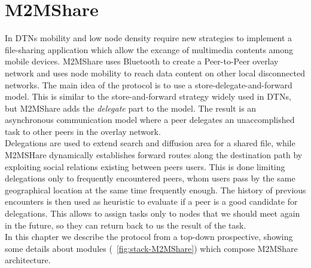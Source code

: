
\chapter{M2MShare}\label{m2mshare} %





In DTNs mobility and low node density require new strategies to implement a file-sharing application which allow the excange of multimedia contents among mobile devices. M2MShare \cite{tesiarmir} uses Bluetooth to create a Peer-to-Peer overlay network and uses node mobility to reach data content on other local disconnected networks. The main idea of the protocol is to use a store-delegate-and-forward model. This is similar to the store-and-forward strategy widely used in DTNs, but M2MShare adds the \textit{delegate} part to the model. The result is an asynchronous communication model where a peer delegates an unaccomplished task to other peers in the overlay network.
\\

Delegations are used to extend search and diffusion area for a shared file, while M2MSHare dynamically establishes forward routes along the destination path by exploiting social relations existing between peers users. This is done limiting delegations only to frequently encountered peers, whom users pass by the same geographical location at the same time frequently enough. The history of previous encounters is then used as heuristic to evaluate if a peer is a good candidate for delegations. This allows to assign tasks only to nodes that we should meet again in the future, so they can return back to us the result of the task.
\\

In this chapter we describe the protocol from a top-down prospective, showing some details about modules (\figurename~\ref{fig:stack-M2MShare}) which compose M2MShare architecture. 

